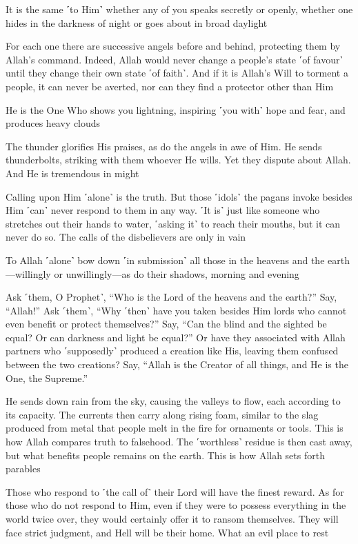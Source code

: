 It is the same ˹to Him˺ whether any of you speaks secretly or openly, whether one hides in the darkness of night or goes about in broad daylight

For each one there are successive angels before and behind, protecting them by Allah’s command. Indeed, Allah would never change a people’s state ˹of favour˺ until they change their own state ˹of faith˺. And if it is Allah’s Will to torment a people, it can never be averted, nor can they find a protector other than Him

He is the One Who shows you lightning, inspiring ˹you with˺ hope and fear, and produces heavy clouds

The thunder glorifies His praises, as do the angels in awe of Him. He sends thunderbolts, striking with them whoever He wills. Yet they dispute about Allah. And He is tremendous in might

Calling upon Him ˹alone˺ is the truth. But those ˹idols˺ the pagans invoke besides Him ˹can˺ never respond to them in any way. ˹It is˺ just like someone who stretches out their hands to water, ˹asking it˺ to reach their mouths, but it can never do so. The calls of the disbelievers are only in vain

To Allah ˹alone˺ bow down ˹in submission˺ all those in the heavens and the earth—willingly or unwillingly—as do their shadows, morning and evening

Ask ˹them, O Prophet˺, “Who is the Lord of the heavens and the earth?” Say, “Allah!” Ask ˹them˺, “Why ˹then˺ have you taken besides Him lords who cannot even benefit or protect themselves?” Say, “Can the blind and the sighted be equal? Or can darkness and light be equal?” Or have they associated with Allah partners who ˹supposedly˺ produced a creation like His, leaving them confused between the two creations? Say, “Allah is the Creator of all things, and He is the One, the Supreme.”

He sends down rain from the sky, causing the valleys to flow, each according to its capacity. The currents then carry along rising foam, similar to the slag produced from metal that people melt in the fire for ornaments or tools. This is how Allah compares truth to falsehood. The ˹worthless˺ residue is then cast away, but what benefits people remains on the earth. This is how Allah sets forth parables

Those who respond to ˹the call of˺ their Lord will have the finest reward. As for those who do not respond to Him, even if they were to possess everything in the world twice over, they would certainly offer it to ransom themselves. They will face strict judgment, and Hell will be their home. What an evil place to rest

